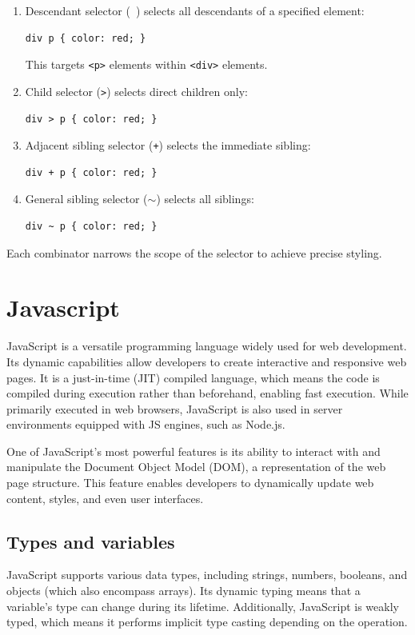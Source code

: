 \begin{enumerate}
\item Descendant selector (\texttt{ }) selects all descendants of a specified element:
\begin{verbatim}
div p { color: red; }
\end{verbatim}
This targets \texttt{<p>} elements within \texttt{<div>} elements.

\item Child selector (\texttt{>}) selects direct children only:
\begin{verbatim}
div > p { color: red; }
\end{verbatim}

\item Adjacent sibling selector (\texttt{+}) selects the immediate sibling:
\begin{verbatim}
div + p { color: red; }
\end{verbatim}

\item General sibling selector (\texttt{$\sim$}) selects all siblings:
\begin{verbatim}
div ~ p { color: red; }
\end{verbatim}
\end{enumerate}
Each combinator narrows the scope of the selector to achieve precise styling.

\section{Javascript}
JavaScript is a versatile programming language widely used for web development. Its dynamic capabilities allow developers to create interactive and responsive web pages. It is a just-in-time (JIT) compiled language, which means the code is compiled during execution rather than beforehand, enabling fast execution. While primarily executed in web browsers, JavaScript is also used in server environments equipped with JS engines, such as Node.js.

One of JavaScript's most powerful features is its ability to interact with and manipulate the Document Object Model (DOM), a representation of the web page structure. This feature enables developers to dynamically update web content, styles, and even user interfaces.

\subsection*{Types and variables}
JavaScript supports various data types, including strings, numbers, booleans, and objects (which also encompass arrays). Its dynamic typing means that a variable's type can change during its lifetime. Additionally, JavaScript is weakly typed, which means it performs implicit type casting depending on the operation.

